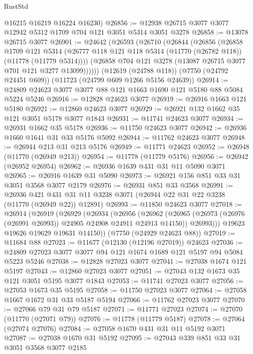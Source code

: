 \begin{lexlean}{RustStd}
\begin{coremodule}
      @16215
      @16219
      @16224
      @16230)
@26856 := @12938 @26715 @3077 @3077 @12942 @5312 @1709 @704 @121 @3051 @5314 @3051 @3278
@26858 := @13078 @26715 @3077
@26901 := @24642
    (@26593
      (@26710
        (@26844
          (@26856
            (@26858
              @1709
              @121
              @5314
              (@26777 @118 @121 @118 @5314 (@11770 (@26782 @118)) (@11778 (@11779 @5314))))
            (@26858 @704 @121 @3278 (@13087 @26715 @3077 @701 @121 @3277 @13099))))))
    (@12619 (@24788 @118))
    (@7750 (@24792 @24451 @609))
    (@11723 (@24799 @609 @1266 @5156 @24639))
@26914 := @24809 @24623 @3077 @3077 @88 @121 @1663 @1690 @121 @5180 @88 @5084 @5224 @5246
@26916 := @12828 @24623 @3077
@26919 := @26916 @1663 @121 @5180
@26921 := @12860 @24623 @3077
@26929 := @26921 @132 @1662 @35 @121 @3051 @5178 @3077 @1843
@26931 := @11741 @24623 @3077
@26934 := @26931 @1662 @35 @5178
@26936 := @11750 @24623 @3077
@26942 := @26936 @1660 @1641 @31 @33 @5176 @5092
@26944 := @11762 @24623 @3077
@26948 := @26944 @213 @31 @213 @5176
@26949 := @11771 @24623
@26952 := @26948 (@11770 (@26949 @213))
@26954 := @11778 (@11779 @5176)
@26956 := @26942 (@26952 @26954)
@26962 := @26936 @1639 @431 @31 @11 @5090 @3071
@26965 := @26916 @1639 @31 @5090
@26973 := @26921 @156 @851 @33 @31 @3051 @3568 @3077 @2179
@26976 := @26931 @851 @33 @3568
@26991 := @26936
    @421
    @431
    @31
    @11
    @3238
    @3071
    (@26944 @22 @31 @22 @3238 (@11770 (@26949 @22)) @12891)
@26993 := @11850 @24623 @3077
@27018 := @26914
    (@26919
      (@26929
        (@26934
          (@26956
            (@26962
              (@26965 (@26973 (@26976 (@26991 @26993)) @24905 @24908 @24911 @24913 @14150))
              @26993)))
        @19623
        @19626
        @19629
        @19631
        @14150))
    (@7750 (@24929 @24623 @88))
@27019 := @11684 @88
@27023 := @11677 (@12130 (@12196 @27019)) @24623
@27036 := @24809 @27023 @3077 @3077 @94 @121 @1674 @1689 @121 @5197 @94 @5084 @5223 @5246
@27038 := @12828 @27023 @3077
@27041 := @27038 @1674 @121 @5197
@27043 := @12860 @27023 @3077
@27051 := @27043 @132 @1673 @35 @121 @3051 @5195 @3077 @1843
@27053 := @11741 @27023 @3077
@27056 := @27053 @1673 @35 @5195
@27058 := @11750 @27023 @3077
@27064 := @27058 @1667 @1672 @31 @33 @5187 @5194
@27066 := @11762 @27023 @3077
@27070 := @27066 @79 @31 @79 @5187
@27071 := @11771 @27023
@27074 := @27070 (@11770 (@27071 @79))
@27076 := @11778 (@11779 @5187)
@27078 := @27064 (@27074 @27076)
@27084 := @27058 @1670 @431 @31 @11 @5192 @3071
@27087 := @27038 @1670 @31 @5192
@27095 := @27043 @339 @851 @33 @31 @3051 @3568 @3077 @2185

\end{coremodule}
\end{lexlean}
